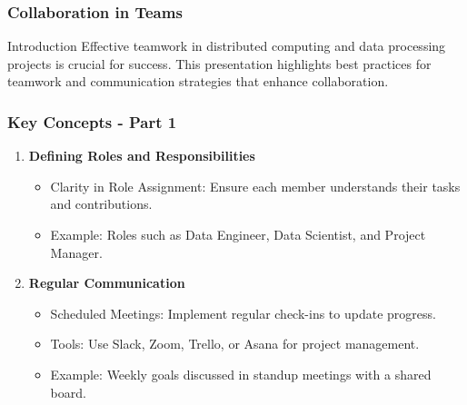 \documentclass[aspectratio=169]{beamer}
\begin{document}
\begin{frame}[fragile]
    \frametitle{Collaboration in Teams}
    \begin{block}{Introduction}
        Effective teamwork in distributed computing and data processing projects is crucial for success. This presentation highlights best practices for teamwork and communication strategies that enhance collaboration.
    \end{block}
\end{frame}

\begin{frame}[fragile]
    \frametitle{Key Concepts - Part 1}
    \begin{enumerate}
        \item \textbf{Defining Roles and Responsibilities}
            \begin{itemize}
                \item Clarity in Role Assignment: Ensure each member understands their tasks and contributions.
                \item Example: Roles such as Data Engineer, Data Scientist, and Project Manager.
            \end{itemize}
        
        \item \textbf{Regular Communication}
            \begin{itemize}
                \item Scheduled Meetings: Implement regular check-ins to update progress.
                \item Tools: Use Slack, Zoom, Trello, or Asana for project management.
                \item Example: Weekly goals discussed in standup meetings with a shared board.
            \end{itemize}
    \end{enumerate}
\end{frame}
\end{document}
